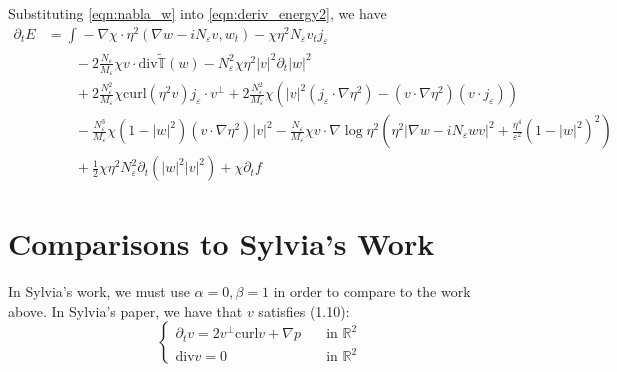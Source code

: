 \documentclass[a4paper]{article}
\newcommand{\R}{\mathbb{R}}
\newcommand{\curl}{\mathrm{curl}}
\renewcommand{\div}{\mathrm{div}}
\begin{document}
Substituting \eqref{eqn:nabla_w} into \eqref{eqn:deriv_energy2}, we have
\begin{align}
  \partial_t E &= \int_{}^{} -\nabla \chi \cdot \eta^2 ( \nabla w - i N_\varepsilon v, w_t ) - \chi \eta^2 N_\varepsilon v_t j_\varepsilon \nonumber \\
  &\quad \quad - 2 \frac{N_\varepsilon}{M_\varepsilon} \chi v \cdot \div \tilde{\mathbb{T}} (w) - N_\varepsilon^2 \chi \eta^2 |v|^2 \partial_t |w|^2
  \nonumber \\
  &\quad \quad + 2 \frac{N_\varepsilon^2}{M_\varepsilon} \chi \curl ( \eta^2 v ) j_\varepsilon \cdot v^\perp + 2 \frac{N_\varepsilon^2}{M_\varepsilon}
  \chi \left( |v|^2 ( j_\varepsilon \cdot \nabla \eta^2 ) - (v \cdot \nabla \eta^2) ( v \cdot j_\varepsilon ) \right) \nonumber \\
  &\quad \quad - \frac{N_\varepsilon^3}{M_\varepsilon} \chi ( 1 - |w|^2 ) (v \cdot \nabla \eta^2) |v|^2 - \frac{N_\varepsilon}{M_\varepsilon} \chi
  v \cdot \nabla \log \eta^2 \left( \eta^2 | \nabla w - i N_\varepsilon w v |^2 + \frac{\eta^4}{\varepsilon^2} ( 1 - |w|^2)^2 \right) \nonumber \\
  &\quad \quad + \frac{1}{2} \chi \eta^2 N_\varepsilon^2 \partial_t ( |w|^2 |v|^2 ) + \chi \partial_t f
  \label{eqn:deriv_energy3}
\end{align}

%

\section{Comparisons to Sylvia's Work}
In Sylvia's work, we must use $\alpha = 0, \beta = 1$ in order to compare to the work above.
In Sylvia's paper, we have that $v$ satisfies (1.10):
\begin{equation}
  \begin{cases}
    \partial_t v = 2 v^\perp \curl v + \nabla p &\quad \text{in } \R^2 \\
    \div v = 0 &\quad \text{in } \R^2
  \end{cases}
  \label{eqn:1.10}
\end{equation}
\end{document}
